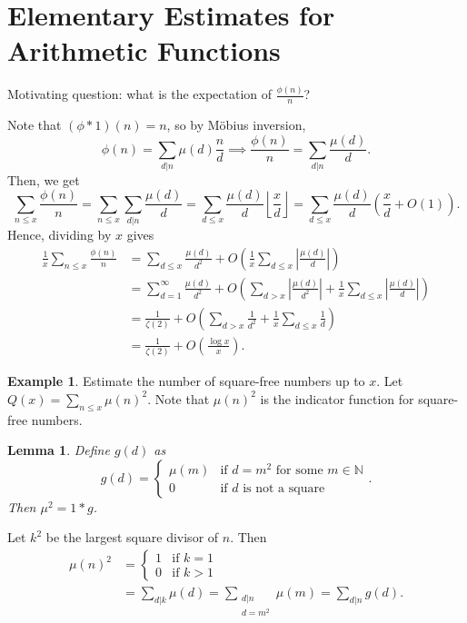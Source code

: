 \documentclass[11pt]{article}
\newtheorem{lemma}[thm]{Lemma}
\theoremstyle{definition}
\newtheorem{example}[thm]{Example}
\newcommand{\floor}[1]{\left\lfloor #1 \right\rfloor}
\newcommand{\abs}[1]{\left\lvert#1\right\rvert} %
\newcommand{\NN}{\mathbb{N}}
\begin{document}
\section{Elementary Estimates for Arithmetic Functions}

Motivating question: what is the expectation of $\frac{\phi(n)}n$?

Note that $(\phi*1)(n)=n$, so by M\"obius inversion,
\[
\phi(n) = \sum_{d|n}\mu(d)\frac{n}d
\implies
\frac{\phi(n)}n = \sum_{d|n}\frac{\mu(d)}{d} .
\]
Then, we get
\[
\sum_{n\le x}\frac{\phi(n)}n
= \sum_{n\le x}\sum_{d|n} \frac{\mu(d)}d
= \sum_{d\le x}\frac{\mu(d)}d\floor{\frac{x}d}
= \sum_{d\le x}\frac{\mu(d)}d \left(\frac{x}{d}+O(1)\right) .
\]
Hence, dividing by $x$ gives
\begin{align*}
\frac1x\sum_{n\le x}\frac{\phi(n)}n
&= \sum_{d\le x}\frac{\mu(d)}{d^2}
+ O\left(\frac1x\sum_{d\le x}\abs{\frac{\mu(d)}{d}}\right) \\
&= \sum_{d=1}^\infty\frac{\mu(d)}{d^2}
+ O\left(\sum_{d>x}\abs{\frac{\mu(d)}{d^2}} + \frac1x\sum_{d\le
x}\abs{\frac{\mu(d)}d}\right) \\
&= \frac1{\zeta(2)} + O\left(\sum_{d>x}\frac1{d^2}+\frac1x\sum_{d\le x}\frac1d\right) \\
&= \frac1{\zeta(2)} + O\left(\frac{\log x}x\right) .
\end{align*}

\begin{example}
Estimate the number of square-free numbers up to $x$. Let $Q(x)=\sum_{n\le x} \mu(n)^2$.
Note that $\mu(n)^2$ is the indicator function for square-free numbers.
\end{example}

\begin{lemma}
Define $g(d)$ as
\[
g(d) = \begin{cases}
\mu(m) &\text{if }d=m^2\text{ for some }m\in\NN \\
0 &\text{if }d\text{ is not a square}
\end{cases} .
\]
Then $\mu^2=1*g$.
\end{lemma}
\proof[Proof 1]
Let $k^2$ be the largest square divisor of $n$. Then
\begin{align*}
\mu(n)^2 &= \begin{cases}
1 &\text{if }k=1 \\
0 &\text{if }k>1
\end{cases} \\
&= \sum_{d|k}\mu(d)
= \sum_{\substack{d|n\\d=m^2}}\mu(m)
= \sum_{d|n} g(d) .
\end{align*}
\qedhere
\end{document}
